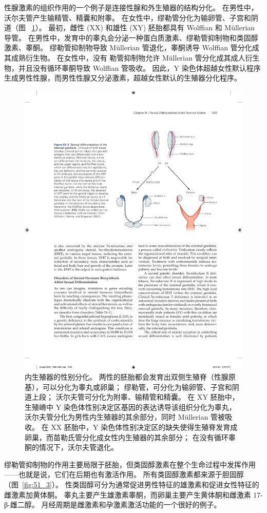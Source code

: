 性腺激素的组织作用的一个例子是连接性腺和外生殖器的结构分化。
在男性中，沃尔夫管产生输精管、精囊和附睾。
在女性中，缪勒管分化为输卵管、子宫和阴道（图 ~\ref{fig:51_2}）。
最初，雌性 (XX) 和雄性 (XY) 胚胎都具有 Wolffian 和 Müllerian 导管。
在男性中，发育中的睾丸会分泌一种蛋白质激素、缪勒管抑制物和类固醇激素、睾酮。
缪勒管抑制物导致 Müllerian 管退化，睾酮诱导 Wolffian 管分化成其成熟衍生物。
在女性中，没有 勒管抑制物允许 Müllerian 管分化成其成人衍生物，并且没有循环睾酮导致 Wolffian 管吸收。
因此，Y 染色体超越女性默认程序生成男性性腺，而男性性腺又分泌激素，超越女性默认的生殖器分化程序。


\begin{figure}[htbp]
	\centering
	\includegraphics[width=0.65\linewidth]{chap51/fig_51_2}
	\caption{内生殖器的性别分化。
		两性的胚胎都会发育出双侧生殖脊（性腺原基），可以分化为睾丸或卵巢； 缪勒管，可分化为输卵管、子宫和阴道上段； 沃尔夫管可分化为附睾、输精管和精囊。
		在 XY 胚胎中，生殖嵴中 Y 染色体性别决定区基因的表达诱导该组织分化为睾丸，沃尔夫管分化为男性内生殖器的其余部分，同时 Müllerian 管被吸收。
		在 XX 胚胎中，Y 染色体性别决定区的缺失使得生殖脊发育成卵巢，而苗勒氏管分化成女性内生殖器的其余部分；
		在没有循环睾酮的情况下，沃尔夫管退化\cite{wilhelm2007sex}。}
	\label{fig:51_2}
\end{figure}


缪勒管抑制物的作用主要局限于胚胎，但类固醇激素在整个生命过程中发挥作用——也就是说，它们在后期也有激活作用。 
所有类固醇激素都来源于胆固醇（图~\ref{fig:51_3}）。
性类固醇可分为通常促进男性特征的雄激素和促进女性特征的雌激素加黄体酮。
睾丸主要产生雄激素睾酮，而卵巢主要产生黄体酮和雌激素 17-β-雌二醇。
月经周期是雌激素和孕激素激活功能的一个很好的例子。


